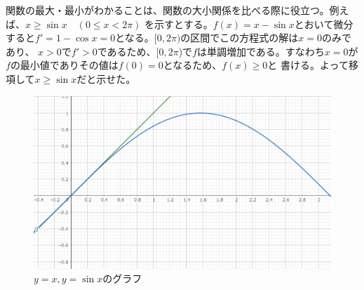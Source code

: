 \documentclass[a4j,dvipdfmx]{jsarticle}
\begin{document}
                    関数の最大・最小がわかることは、関数の大小関係を比べる際に役立つ。例えば、$x\geq \sin x\quad(0\leq x < 2\pi)$
                    を示すとする。$f(x)=x-\sin x$とおいて微分すると$f'=1 - \cos x = 0$となる。$[0,2\pi)$の区間でこの方程式の解は$x=0$のみであり、
                    $x>0$で$f'>0$であるため、$[0,2\pi$)で$f$は単調増加である。すなわち$x=0$が$f$の最小値でありその値は$f(0)=0$となるため、$f(x)\geq 0$と
                    書ける。よって移項して$x\geq \sin x$だと示せた。
                    \begin{figure}[h]
                        \centering
                        \includegraphics[scale=0.5]{img/QuuNote/x-sinxGraph.png}
                        \caption{$y=x,y=\sin x$のグラフ}
                    \end{figure}
                \clearpage
\end{document}
